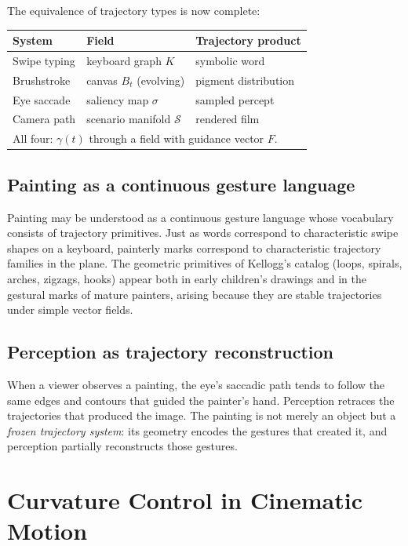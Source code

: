 \documentclass[12pt,a4paper]{article}
\theoremstyle{plain}
\theoremstyle{definition}
\begin{document}
The equivalence of trajectory types is now complete:

\begin{center}
\begin{tabular}{lll}
\toprule
System & Field & Trajectory product \\
\midrule
Swipe typing  & keyboard graph $K$         & symbolic word \\
Brushstroke   & canvas $B_t$ (evolving)     & pigment distribution \\
Eye saccade   & saliency map $\sigma$       & sampled percept \\
Camera path   & scenario manifold $\mathcal{S}$ & rendered film \\
\midrule
\multicolumn{3}{l}{All four: $\gamma(t)$ through a field with guidance vector $F$.} \\
\bottomrule
\end{tabular}
\end{center}

\subsection{Painting as a continuous gesture language}

Painting may be understood as a continuous gesture language whose vocabulary
consists of trajectory primitives. Just as words correspond to characteristic
swipe shapes on a keyboard, painterly marks correspond to characteristic
trajectory families in the plane. The geometric primitives of Kellogg's catalog
(loops, spirals, arches, zigzags, hooks) appear both in early children's
drawings and in the gestural marks of mature painters, arising because they are
stable trajectories under simple vector fields.

\subsection{Perception as trajectory reconstruction}

When a viewer observes a painting, the eye's saccadic path tends to follow the
same edges and contours that guided the painter's hand. Perception retraces the
trajectories that produced the image. The painting is not merely an object but
a \emph{frozen trajectory system}: its geometry encodes the gestures that
created it, and perception partially reconstructs those gestures.

\section{Curvature Control in Cinematic Motion}
\label{sec:curvature}
\end{document}
